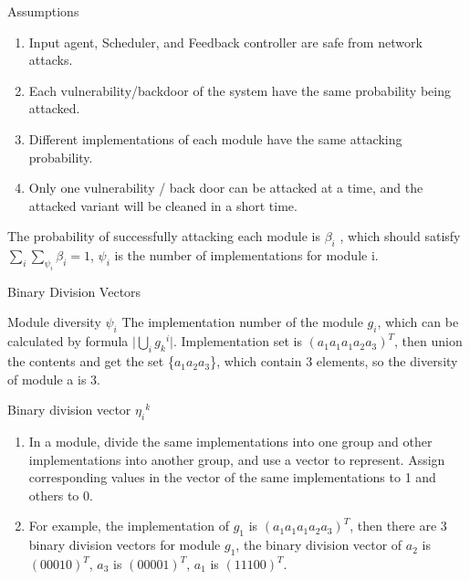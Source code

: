 \documentclass{beamer}
\begin{document}
\begin{frame}{Assumptions}
    \begin{block}{}
        \begin{enumerate}
            \item Input agent, Scheduler, and Feedback controller are safe from network attacks.
            \item Each vulnerability/backdoor of the system have the same probability being attacked.
            \item Different implementations of each module have the same attacking probability.
            \item Only one vulnerability / back door can be attacked at a time, and the attacked variant will be cleaned in a short time.
        \end{enumerate}
    \end{block}
    The probability of successfully attacking each module is $\beta_i$ , which should satisfy $\sum_{i}^{}\sum_{\psi_i}^{} \beta_i = 1$, $\psi_i$ is the number of implementations for module i.
\end{frame}
\begin{frame}{Binary Division Vectors}
    \begin{block}{Module diversity  $\psi_i$}
        The implementation number of the module $g_i$, which can be calculated by formula $\lvert \bigcup\limits_{i}{g_k}^i \rvert$. Implementation set is $(a_1a_1a_1a_2a_3)^T$, then union the contents and get the set \{$a_1a_2a_3$\}, which contain 3 elements, so the diversity of module a is 3.
    \end{block}
    \begin{block}{Binary division vector ${\eta_{i}}^k$}
        \begin{enumerate}
            \item In a module, divide the same implementations into one group and other implementations into another group, and use a vector to represent. Assign corresponding values in the vector of the same implementations to 1 and others to 0.
            \item For example, the implementation of $g_{1}$ is ${(a_{1}a_{1}a_{1}a_{2}a_{3})^T}$, then there are 3 binary division vectors for module $g_1$, the binary division vector of $a_2$ is $(00010)^T$, $a_3$ is $(00001)^T$, $a_1$ is $(11100)^T$.
        \end{enumerate}
    \end{block}
\end{frame}
\end{document}
